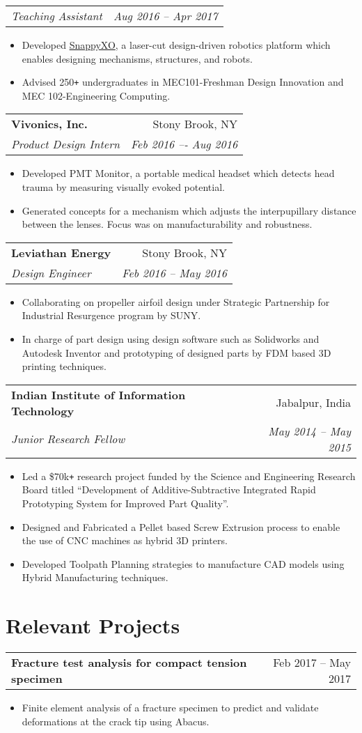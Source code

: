 \documentclass[letterpaper,10pt]{article}
\makeatletter
\newcommand{\resumeHeading}[4]{
  \vspace{-1pt}
    \begin{tabular*}{0.97\textwidth}{l@{\extracolsep{\fill}}r}
      \textbf{#1} & #2 \vspace{-2pt}\\ \vspace{1pt}
      \textit{\small#3} & \textit{\small #4} \\
    \end{tabular*}
}
\newcommand{\resumeSubheadingWithDate}[2]{
    \begin{tabular*}{0.97\textwidth}{l@{\extracolsep{\fill}}r}
      \textit{\small#1} & \textit{\small #2}\\
    \end{tabular*}
    \vspace{+2pt}
}
\newcommand{\resumeHeadingwithDate}[2]{
	\vspace{-1pt}
	\begin{tabular*}{0.97\textwidth}{l@{\extracolsep{\fill}}r}
		\textbf{#1} & #2 \vspace{-2pt}\\
	\end{tabular*}
	\vspace{+2pt}
}
\newcommand{\resumeSection}[1]{
\vspace{-12pt}
\section{\textbf{#1}}
}
\newcommand{\resumeItemListStart}{
\vspace{-7pt}
\begin{itemize}[leftmargin=14pt]
}
\newcommand{\resumeItemListEnd}{
\vspace{+7pt}
\end{itemize}
}
\newcommand{\resumeItem}[1]{
  \item\small{
      {#1 \vspace{-7pt}
      }
  }
}
\makeatother
\begin{document}
    \vspace{-5pt}
    \resumeSubheadingWithDate{Teaching Assistant}{Aug 2016 -- Apr 2017}
    \resumeItemListStart
    \resumeItem{Developed \href{http://snappyxo.com/}{SnappyXO}, a laser-cut design-driven robotics platform which enables designing mechanisms, structures, and robots.}
    \resumeItem{Advised 250\texttt{+} undergraduates in MEC101-Freshman Design Innovation and MEC 102-Engineering Computing.}
    \resumeItemListEnd
    
    \resumeHeading
    {Vivonics, Inc.}{Stony Brook, NY}
    {Product Design Intern}{Feb 2016 –- Aug 2016}
    \resumeItemListStart
    \resumeItem{Developed PMT Monitor, a portable medical headset which detects head trauma by measuring visually evoked potential.}
    \resumeItem{Generated concepts for a mechanism which adjusts the interpupillary distance between the lenses. Focus was on manufacturability and robustness.}
    \resumeItemListEnd
    
    \resumeHeading
    {Leviathan Energy}{Stony Brook, NY}
    {Design Engineer}{Feb 2016 – May 2016}
    \resumeItemListStart
    \resumeItem{Collaborating on propeller airfoil design under Strategic Partnership for Industrial Resurgence program by SUNY.}
    \resumeItem{In charge of part design using design software such as Solidworks and Autodesk Inventor and prototyping of designed parts by FDM based 3D printing techniques. }
    \resumeItemListEnd
    
    \resumeHeading
    {Indian Institute of Information Technology}{Jabalpur, India}
    {Junior Research Fellow}{May 2014 -- May 2015}
    \resumeItemListStart
    \resumeItem{Led a \$70k\texttt{+} research project funded by the Science and Engineering Research Board titled “Development of Additive-Subtractive Integrated Rapid Prototyping System for Improved Part Quality”.}
    \resumeItem{Designed and Fabricated a Pellet based Screw Extrusion process to enable the use of CNC machines as hybrid 3D printers.}
    \resumeItem{Developed Toolpath Planning strategies to manufacture CAD models using Hybrid Manufacturing techniques.}
    \resumeItemListEnd



\resumeSection{Relevant Projects}
    \resumeHeadingwithDate{Fracture test analysis for compact tension specimen}{Feb 2017 -- May 2017}
    \resumeItemListStart
    \resumeItem{Finite element analysis of a fracture specimen to predict and validate deformations at the crack tip using Abacus.}
    \resumeItemListEnd
    
\end{document}
